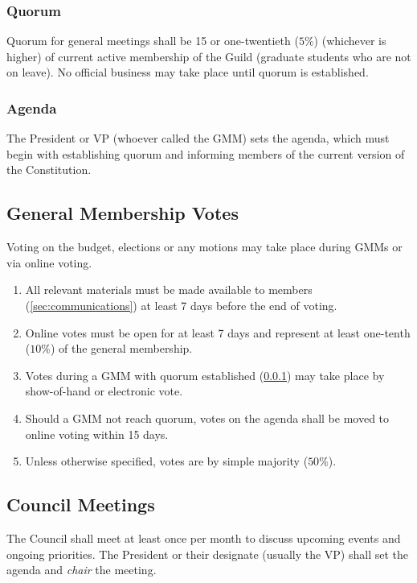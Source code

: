 \subsubsection{Quorum}\label{sec:quorum}
Quorum for general meetings shall be 15 or one-twentieth ($5\%$) (whichever is
higher) of current active membership of the Guild (graduate students who are
not on leave). No official business may take place until quorum is established.

\subsubsection{Agenda}
The President or VP (whoever called the GMM) sets the agenda, which must begin
with establishing quorum and informing members of the current version of the
Constitution.

\subsection{General Membership Votes}\label{sec:voting}
Voting on the budget, elections or any motions may take place during GMMs or
via online voting.

\begin{enumerate}
      \item All relevant materials must be made available to members
            (\ref{sec:communications}) at least 7 days before the end of voting.
      \item Online votes must be open for at least 7 days and represent at least one-tenth
            ($10\%$) of the general membership.
      \item Votes during a GMM with quorum established (\ref{sec:quorum}) may take place by
            show-of-hand or electronic vote.
      \item Should a GMM not reach quorum, votes on the agenda shall be moved to online
            voting within 15 days.
      \item Unless otherwise specified, votes are by simple majority ($50\%$).
\end{enumerate}

\subsection{Council Meetings}\label{sec:council-meetings}
The Council shall meet at least once per month to discuss upcoming events and
ongoing priorities. The President or their designate (usually the VP) shall set
the agenda and \textit{chair} the meeting.

